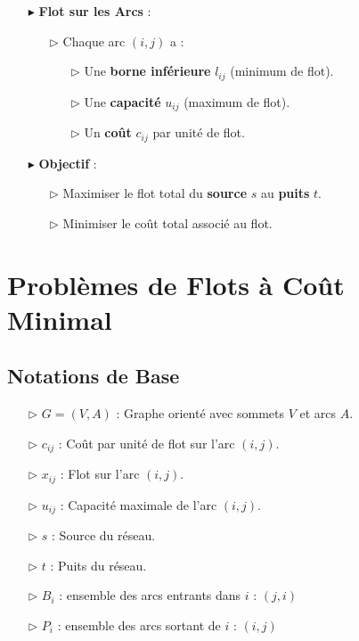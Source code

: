 \documentclass{report}
\begin{document}
\begin{multicols*}{2}
\begin{itemize}
    \item[$\blacktriangleright$] \textbf{Flot sur les Arcs} :
    \begin{itemize}
        \item[$\rhd$] Chaque arc \( (i, j) \) a :
        \begin{itemize}
            \item[$\rhd$] Une \textbf{borne inférieure} \( l_{ij} \) (minimum de flot).
            \item[$\rhd$] Une \textbf{capacité} \( u_{ij} \) (maximum de flot).
            \item[$\rhd$] Un \textbf{coût} \( c_{ij} \) par unité de flot.
        \end{itemize}
    \end{itemize}
    \item[$\blacktriangleright$] \textbf{Objectif} :
    \begin{itemize}
        \item[$\rhd$] Maximiser le flot total du \textbf{source} \( s \) au \textbf{puits} \( t \).
        \item[$\rhd$] Minimiser le coût total associé au flot.
    \end{itemize}
\end{itemize}

\section{Problèmes de Flots à Coût Minimal}

\subsection{Notations de Base}

\begin{itemize}
    \item[$\rhd$] \( G = (V, A) \) : Graphe orienté avec sommets \( V \) et arcs \( A \).
    \item[$\rhd$] \( c_{ij} \) : Coût par unité de flot sur l'arc \( (i, j) \).
    \item[$\rhd$] \( x_{ij} \) : Flot sur l'arc \( (i, j) \).
    \item[$\rhd$] \( u_{ij} \) : Capacité maximale de l'arc \( (i, j) \).
    \item[$\rhd$] \( s \) : Source du réseau.
    \item[$\rhd$] \( t \) : Puits du réseau.
    \item [$\rhd$ ] $B_i$ : ensemble des arcs entrants dans $i$ : $(j,i)$
    \item [$\rhd$ ] $P_i$ : ensemble des arcs sortant de  $i$ : $(i, j)$
\end{itemize}

\end{multicols*}
\end{document}
